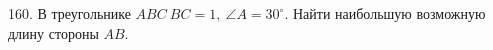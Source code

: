 160. В треугольнике $ABC\ BC=1,\ \angle A=30^\circ.$ Найти наибольшую возможную длину стороны $AB.$\\
